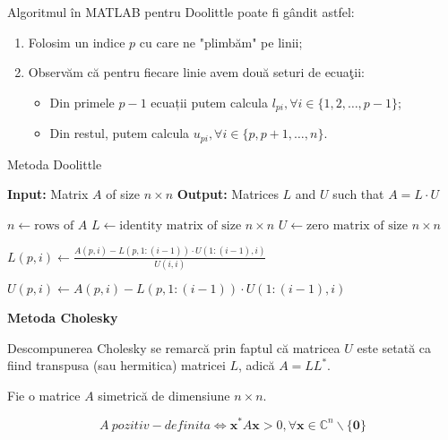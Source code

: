 \documentclass{exam}
\newcommand{\octavescript}[2]{
	
}
\begin{document}
\par Algoritmul în MATLAB pentru Doolittle poate fi gândit astfel:

\begin{enumerate}
	\item Folosim un indice $p$ cu care ne "plimbăm" pe linii;
	\item Observăm că pentru fiecare linie avem două seturi de ecuaţii:
	      \begin{itemize}
		      \item Din primele $p - 1$ ecuații putem calcula $l_{pi}, \forall i \in \{1, 2, \ldots, p - 1\}$;
		      \item Din restul, putem calcula $u_{pi}, \forall i \in \{p, p + 1, \ldots, n\}$.
	      \end{itemize}
\end{enumerate}

\newpage

\begin{algorithm}
	\caption{Metoda Doolittle}
	\begin{algorithmic}[1]
		\State \textbf{Input:} Matrix \( A \) of size \( n \times n \)
		\State \textbf{Output:} Matrices \( L \) and \( U \) such that \( A = L \cdot U \)

		\State \( n \gets \text{rows of } A \)
		\State \( L \gets \text{identity matrix of size } n \times n \)
		\State \( U \gets \text{zero matrix of size } n \times n \)

		\State \( L(p, i) \gets \frac{A(p, i) - L(p, 1:(i-1)) \cdot U(1:(i-1), i)}{U(i, i)} \)
		\EndFor

		\State \( U(p, i) \gets A(p, i) - L(p, 1:(i-1)) \cdot U(1:(i-1), i) \)
		\EndFor
		\EndFor
	\end{algorithmic}
\end{algorithm}

\textbf{Metoda Cholesky}

\par Descompunerea Cholesky se remarcă prin faptul că matricea $U$ este setată
ca fiind transpusa (sau hermitica) matricei $L$, adică $A = LL^*$.

\par Fie o matrice $A$ simetrică de dimensiune $n \times n$.

\begin{equation*}
	A \ pozitiv-definita \Leftrightarrow \mathbf{x}^* A \mathbf{x} > 0, \forall \mathbf{x} \in \mathbb{C}^n \backslash \{\mathbf{0}\}
\end{equation*}
\end{document}
